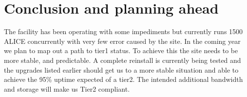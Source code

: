 \documentclass[a4paper]{jpconf}
\begin{document}
\section{Conclusion and planning ahead}
The facility has been operating with some impediments but currently runs 1500 ALICE concurrently with very few error caused by the site.
In the coming year we plan to map out a path to tier1 status. To achieve this the site needs to be more stable, and predictable. 
A complete reinstall is currently being tested and the upgrades listed earlier should get us to a more stable situation and able to achieve the 95\% uptime expected of a tier2.
The intended additional bandwidth and storage will make us Tier2 compliant.
\end{document}
